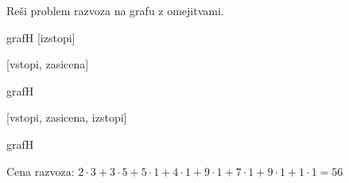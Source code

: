 \documentclass[14pt]{extarticle}
\begin{document}
Reši problem razvoza na grafu z omejitvami.

\begin{razvoz}[scale=0.8]{grafH}
    [izstopi]


    [vstopi, zasicena]
\end{razvoz}

\begin{razvoz}[scale=0.8]{grafH}


    [vstopi, zasicena, izstopi]
\end{razvoz}

\begin{razvoz}[scale=0.8]{grafH}

\end{razvoz}

Cena razvoza: $2 \cdot 3 + 3 \cdot 5 + 5 \cdot 1 + 4 \cdot 1 + 9 \cdot 1 + 7 \cdot 1 + 9 \cdot 1 + 1 \cdot 1 = 56$
\end{document}
